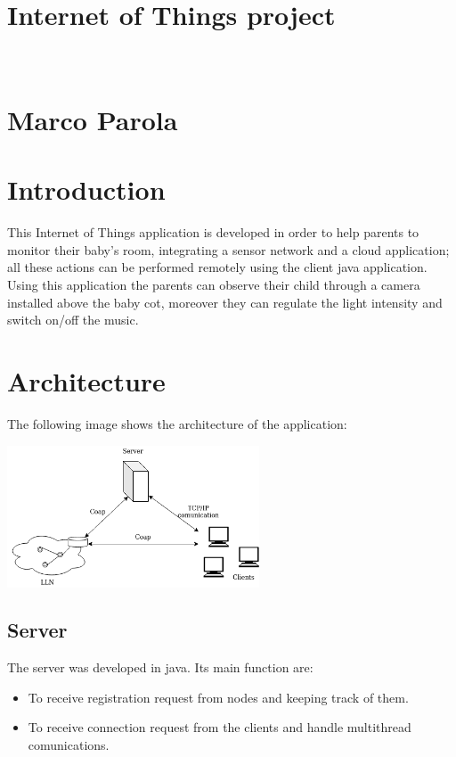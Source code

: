 \documentclass[a4paper]{article}
\begin{document}
\baselineskip 13pt

\begin{center}
\section*{\\Internet of Things project\\}
\section*{\\Marco Parola\\}
\end{center}

\clearpage

\section{Introduction}
This Internet of Things application is developed in order to help parents to monitor their baby's room, integrating a sensor network and a cloud application; all these actions can be performed remotely using the client java application.\\
Using this application the parents can observe their child through a camera installed above the baby cot, moreover they can regulate the light intensity and switch on/off the music.\\


\section{Architecture}
The following image shows the architecture of the application:
\begin{center}
\vspace{5mm}
\includegraphics[width=75mm]{architecture.png}
\vspace{5mm}
\end{center}

\subsection{Server}
The server was developed in java. Its main function are:
\begin{itemize}
\item To receive registration request from nodes and keeping track of them.
\item To receive connection request from the clients and handle multithread comunications.
\end{itemize}
\end{document}
